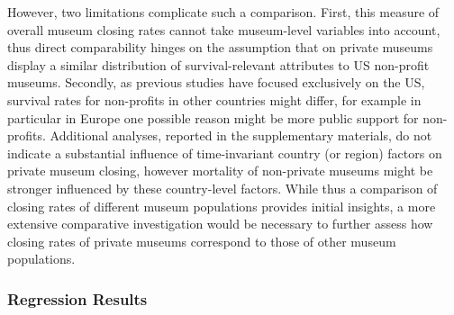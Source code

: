 \documentclass[12pt]{article}
\begin{document}
However, two limitations complicate such a comparison.
First, this measure of overall museum closing rates cannot take museum-level variables into account, thus direct comparability hinges on the assumption that on private museums display a similar distribution of survival-relevant attributes to US non-profit museums.
Secondly, as previous studies have focused exclusively on the US, survival rates for non-profits in other countries might differ, for example in particular in Europe one possible reason might be more public support for non-profits.
Additional analyses, reported in the supplementary materials, do not indicate a substantial influence of time-invariant country (or region) factors on private museum closing, however mortality of non-private museums might be stronger influenced by these country-level factors.
While thus a comparison of closing rates of different museum populations provides initial insights, a more extensive comparative investigation would be necessary to further assess how closing rates of private museums correspond to those of other museum populations.
\subsubsection*{Regression Results}
\end{document}
